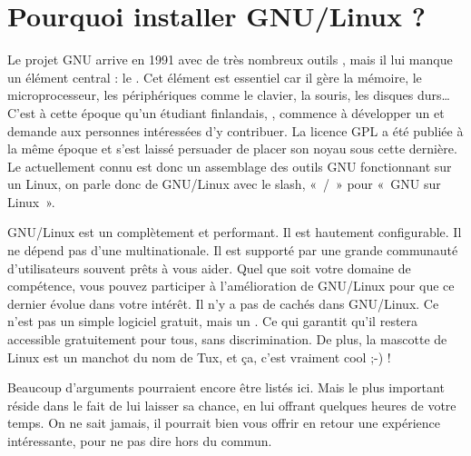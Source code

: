 \section{Pourquoi installer GNU/Linux ?}
Le projet GNU arrive en 1991 avec de très nombreux outils , mais il lui manque un élément central : le . Cet élément est essentiel car il gère la mémoire, le microprocesseur, les périphériques comme le clavier, la souris, les disques durs\ldots{}\\
C'est à cette époque qu'un étudiant finlandais, , commence à développer un  et demande aux personnes intéressées d'y contribuer. La licence GPL a été publiée à la même époque et  s'est laissé persuader de placer son noyau sous cette dernière. Le  actuellement connu est donc un assemblage des outils GNU fonctionnant sur un  Linux, on parle donc de GNU/Linux avec le slash, «~/~» pour «~GNU sur Linux~».\par
GNU/Linux est un  complètement  et performant. Il est hautement configurable. Il ne dépend pas d'une multinationale. Il est supporté par une grande communauté d'utilisateurs souvent prêts à vous aider. Quel que soit votre domaine de compétence, vous pouvez participer à l'amélioration de GNU/Linux pour que ce dernier évolue dans votre intérêt. Il n'y a pas de  cachés dans GNU/Linux. Ce n'est pas un simple logiciel gratuit, mais un . Ce qui garantit qu'il restera accessible gratuitement pour tous, sans discrimination. De plus, la mascotte de Linux est un manchot du nom de Tux, et ça, c'est vraiment cool ;-) !\par
Beaucoup d'arguments pourraient encore être listés ici. Mais le plus important réside dans le fait de lui laisser sa chance, en lui offrant quelques heures de votre temps. On ne sait jamais, il pourrait bien vous offrir en retour une expérience intéressante, pour ne pas dire hors du commun.\par
